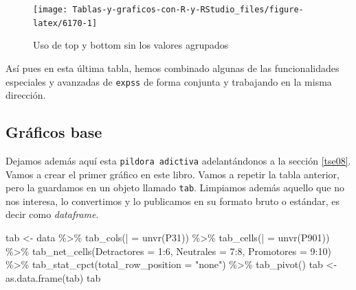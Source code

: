 \documentclass[
]{book}
\newenvironment{Shaded}{\begin{snugshade}}{\end{snugshade}}
\newcommand{\AttributeTok}[1]{\textcolor[rgb]{0.77,0.63,0.00}{#1}}
\newcommand{\DecValTok}[1]{\textcolor[rgb]{0.00,0.00,0.81}{#1}}
\newcommand{\FunctionTok}[1]{\textcolor[rgb]{0.00,0.00,0.00}{#1}}
\newcommand{\NormalTok}[1]{#1}
\newcommand{\OtherTok}[1]{\textcolor[rgb]{0.56,0.35,0.01}{#1}}
\newcommand{\SpecialCharTok}[1]{\textcolor[rgb]{0.00,0.00,0.00}{#1}}
\newcommand{\StringTok}[1]{\textcolor[rgb]{0.31,0.60,0.02}{#1}}
\begin{document}
\begin{figure}[H]

{\centering \texttt{[image: Tablas-y-graficos-con-R-y-RStudio\_files/figure-latex/6170-1]} 

}

\caption{Uso de top y bottom sin los valores agrupados}\label{fig:6170}
\end{figure}

Así pues en esta última tabla, hemos combinado algunas de las funcionalidades especiales y avanzadas de \texttt{expss} de forma conjunta y trabajando en la misma dirección.

\hypertarget{gruxe1ficos-base}{%
\subsection{Gráficos base}\label{gruxe1ficos-base}}

Dejamos además aquí esta \texttt{pildora\ adictiva} adelantándonos a la sección \ref{tse08}. Vamos a crear el primer gráfico en este libro. Vamos a repetir la tabla anterior, pero la guardamos en un objeto llamado \texttt{tab}. Limpiamos además aquello que no nos interesa, lo convertimos y lo publicamos en su formato bruto o estándar, es decir como \emph{dataframe}.

\begin{Shaded}
\begin{Highlighting}[]
\NormalTok{tab }\OtherTok{\textless{}{-}}\NormalTok{ data }\SpecialCharTok{\%\textgreater{}\%}
  \FunctionTok{tab\_cols}\NormalTok{(}\StringTok{\textasciigrave{}}\AttributeTok{|}\StringTok{\textasciigrave{}} \OtherTok{=} \FunctionTok{unvr}\NormalTok{(P31)) }\SpecialCharTok{\%\textgreater{}\%}
  \FunctionTok{tab\_cells}\NormalTok{(}\StringTok{\textasciigrave{}}\AttributeTok{|}\StringTok{\textasciigrave{}} \OtherTok{=} \FunctionTok{unvr}\NormalTok{(P901)) }\SpecialCharTok{\%\textgreater{}\%}
  \FunctionTok{tab\_net\_cells}\NormalTok{(}\AttributeTok{Detractores =} \DecValTok{1}\SpecialCharTok{:}\DecValTok{6}\NormalTok{, }\AttributeTok{Neutrales =} \DecValTok{7}\SpecialCharTok{:}\DecValTok{8}\NormalTok{, }\AttributeTok{Promotores =} \DecValTok{9}\SpecialCharTok{:}\DecValTok{10}\NormalTok{) }\SpecialCharTok{\%\textgreater{}\%}
  \FunctionTok{tab\_stat\_cpct}\NormalTok{(}\AttributeTok{total\_row\_position =} \StringTok{"none"}\NormalTok{) }\SpecialCharTok{\%\textgreater{}\%}
  \FunctionTok{tab\_pivot}\NormalTok{()}
\NormalTok{tab }\OtherTok{\textless{}{-}} \FunctionTok{as.data.frame}\NormalTok{(tab)}
\NormalTok{tab}
\end{Highlighting}
\end{Shaded}
\end{document}
